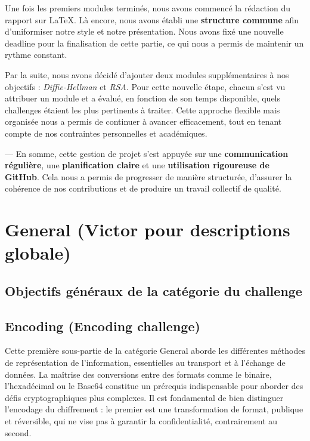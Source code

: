 \documentclass[12pt, a4paper]{article}
\begin{document}
    Une fois les premiers modules terminés, nous avons commencé la rédaction du
    rapport sur \LaTeX{}. Là encore, nous avons établi une \textbf{structure
    commune} afin d’uniformiser notre style et notre présentation. Nous avons
    fixé une nouvelle deadline pour la finalisation de cette partie, ce qui
    nous a permis de maintenir un rythme constant.

    Par la suite, nous avons décidé d’ajouter deux modules supplémentaires à nos
    objectifs : \textit{Diffie-Hellman} et \textit{RSA}. Pour cette nouvelle
    étape, chacun s’est vu attribuer un module et a évalué, en fonction de son
    temps disponible, quels challenges étaient les plus pertinents à traiter.
    Cette approche flexible mais organisée nous a permis de continuer à avancer
    efficacement, tout en tenant compte de nos contraintes personnelles et
    académiques.

    ---
    En somme, cette gestion de projet s’est appuyée sur une
    \textbf{communication régulière}, une \textbf{planification claire} et une
    \textbf{utilisation rigoureuse de GitHub}. Cela nous a permis de progresser
    de manière structurée, d’assurer la cohérence de nos contributions et de
    produire un travail collectif de qualité.

    \section{General (Victor pour descriptions globale)}
    \subsection{Objectifs généraux de la catégorie du challenge}

    \subsection{Encoding (Encoding challenge)}
    Cette première sous-partie de la catégorie General aborde les différentes
    méthodes de représentation de l'information, essentielles au transport et
    à l'échange de données. La maîtrise des conversions entre des formats
    comme le binaire, l'hexadécimal ou le Base64 constitue un prérequis
    indispensable pour aborder des défis cryptographiques plus complexes. Il
    est fondamental de bien distinguer l'encodage du chiffrement : le premier
    est une transformation de format, publique et réversible, qui ne vise pas
    à garantir la confidentialité, contrairement au second.
\end{document}
